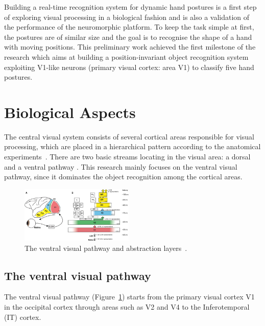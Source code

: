 \documentclass[journal]{journal}
\begin{document}
Building a real-time recognition system for dynamic hand postures is a first step of exploring visual processing in a biological fashion and is also a validation of the performance of the neuromorphic platform.
To keep the task simple at first, the postures are of similar size and the goal is to recognise the shape of a hand with moving positions.
This preliminary work achieved the first milestone of the research which aims at building a position-invariant object recognition system exploiting V1-like neurons (primary visual cortex: area V1) to classify five hand postures. 

\section{Biological Aspects}
\label{sec:bio}
The central visual system consists of several cortical areas responsible for visual processing, which are placed in a hierarchical pattern according to the anatomical experiments~\cite{felleman1991distributed}.
There are two basic streams locating in the visual area: a dorsal and a ventral pathway .%
This research mainly focuses on the ventral visual pathway, since it dominates the object recognition among the cortical areas.
\begin{figure}[h!]
	\centering
	\includegraphics[width=0.48\textwidth]{pics/ventral.jpg}
	\caption{The ventral visual pathway and abstraction layers~\cite{dicarlo2012does}.
}
	\label{Fig:Ventral}
\end{figure}

\subsection{The ventral visual pathway}
The ventral visual pathway (Figure~\ref{Fig:Ventral}) starts from the primary visual cortex V1 in the occipital cortex through areas such as V2 and V4 to the Inferotemporal (IT) cortex.
\end{document}
